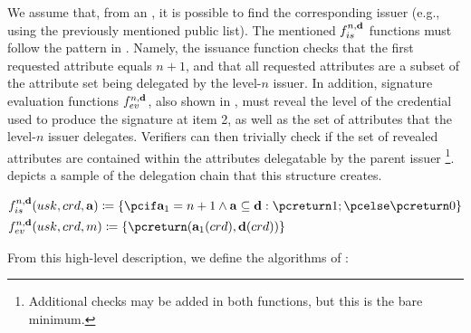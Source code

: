 We assume that, from an \ipk, it is possible to find the corresponding issuer
(e.g., using the previously mentioned public list). The mentioned
$f_{is}^{n,\mathbf{d}}$ functions must follow the pattern in .
Namely, the issuance function checks that the first requested attribute equals
$n+1$, and that all requested attributes are a subset of the attribute set
\dattrs being delegated by the level-$n$ issuer. In addition, signature
evaluation functions $f_{ev}^{n,\mathbf{d}}$, also shown in ,
must reveal the level of the credential used to produce the \UAS signature at
item 2, as well as the set of attributes \dattrs that the level-$n$ issuer
delegates. Verifiers can then trivially check if the set of revealed attributes
are contained within the attributes delegatable by the parent issuer%
\footnote{Additional checks may be added in both functions, but this is
  the bare minimum.}.  depicts a sample of the delegation chain
that this structure creates.
 
\begin{align}
  & \fissue^{n,\dattrs}(\usk,\cred,\attrs) \coloneqq \lbrace
    \pcif \attrs_1 = n+1 \land \attrs \subseteq \dattrs: \pcreturn 1; \pcelse \pcreturn 0
    \rbrace \nonumber \\
  & \feval^{n,\dattrs}(\usk,\cred,\msg) \coloneqq \lbrace
    \pcreturn (\attrs_1(\cred),\dattrs(\cred)) \rbrace
  \label{eq:funcs-dac}
\end{align}

From this high-level description, we define the algorithms of \CUASDAC:

